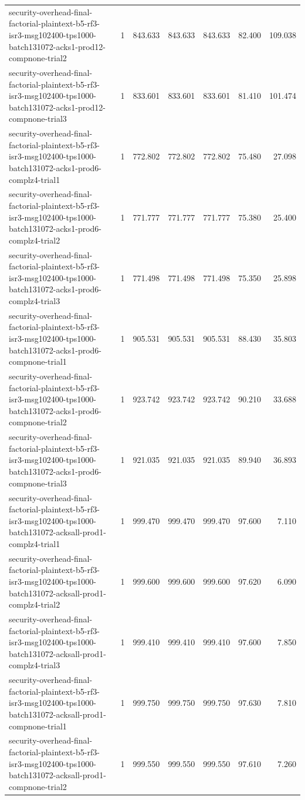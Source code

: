 \begin{tabular}{lrrrrrr}
security-overhead-final-factorial-plaintext-b5-rf3-isr3-msg102400-tps1000-batch131072-acks1-prod12-compnone-trial2 & 1 & 843.633 & 843.633 & 843.633 & 82.400 & 109.038 \\
security-overhead-final-factorial-plaintext-b5-rf3-isr3-msg102400-tps1000-batch131072-acks1-prod12-compnone-trial3 & 1 & 833.601 & 833.601 & 833.601 & 81.410 & 101.474 \\
security-overhead-final-factorial-plaintext-b5-rf3-isr3-msg102400-tps1000-batch131072-acks1-prod6-complz4-trial1 & 1 & 772.802 & 772.802 & 772.802 & 75.480 & 27.098 \\
security-overhead-final-factorial-plaintext-b5-rf3-isr3-msg102400-tps1000-batch131072-acks1-prod6-complz4-trial2 & 1 & 771.777 & 771.777 & 771.777 & 75.380 & 25.400 \\
security-overhead-final-factorial-plaintext-b5-rf3-isr3-msg102400-tps1000-batch131072-acks1-prod6-complz4-trial3 & 1 & 771.498 & 771.498 & 771.498 & 75.350 & 25.898 \\
security-overhead-final-factorial-plaintext-b5-rf3-isr3-msg102400-tps1000-batch131072-acks1-prod6-compnone-trial1 & 1 & 905.531 & 905.531 & 905.531 & 88.430 & 35.803 \\
security-overhead-final-factorial-plaintext-b5-rf3-isr3-msg102400-tps1000-batch131072-acks1-prod6-compnone-trial2 & 1 & 923.742 & 923.742 & 923.742 & 90.210 & 33.688 \\
security-overhead-final-factorial-plaintext-b5-rf3-isr3-msg102400-tps1000-batch131072-acks1-prod6-compnone-trial3 & 1 & 921.035 & 921.035 & 921.035 & 89.940 & 36.893 \\
security-overhead-final-factorial-plaintext-b5-rf3-isr3-msg102400-tps1000-batch131072-acksall-prod1-complz4-trial1 & 1 & 999.470 & 999.470 & 999.470 & 97.600 & 7.110 \\
security-overhead-final-factorial-plaintext-b5-rf3-isr3-msg102400-tps1000-batch131072-acksall-prod1-complz4-trial2 & 1 & 999.600 & 999.600 & 999.600 & 97.620 & 6.090 \\
security-overhead-final-factorial-plaintext-b5-rf3-isr3-msg102400-tps1000-batch131072-acksall-prod1-complz4-trial3 & 1 & 999.410 & 999.410 & 999.410 & 97.600 & 7.850 \\
security-overhead-final-factorial-plaintext-b5-rf3-isr3-msg102400-tps1000-batch131072-acksall-prod1-compnone-trial1 & 1 & 999.750 & 999.750 & 999.750 & 97.630 & 7.810 \\
security-overhead-final-factorial-plaintext-b5-rf3-isr3-msg102400-tps1000-batch131072-acksall-prod1-compnone-trial2 & 1 & 999.550 & 999.550 & 999.550 & 97.610 & 7.260 \\

\end{tabular}
